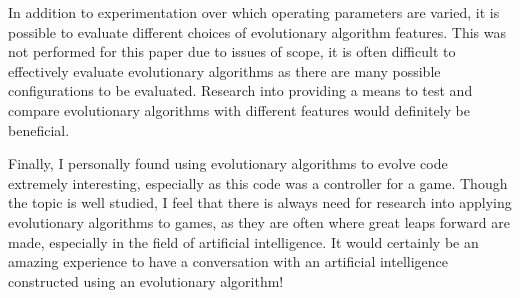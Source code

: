 \documentclass[a4paper, 12pt]{article}
\begin{document}
In addition to experimentation over which operating parameters are varied, it is possible to evaluate different choices of evolutionary algorithm features. This was not performed for this paper due to issues of scope, it is often difficult to effectively evaluate evolutionary algorithms as there are many possible configurations to be evaluated. Research into providing a means to test and compare evolutionary algorithms with different features would definitely be beneficial.

Finally, I personally found using evolutionary algorithms to evolve code extremely interesting, especially as this code was a controller for a game. Though the topic is well studied, I feel that there is always need for research into applying evolutionary algorithms to games, as they are often where great leaps forward are made, especially in the field of artificial intelligence. It would certainly be an amazing experience to have a conversation with an artificial intelligence constructed using an evolutionary algorithm!





%
%

\end{document}

